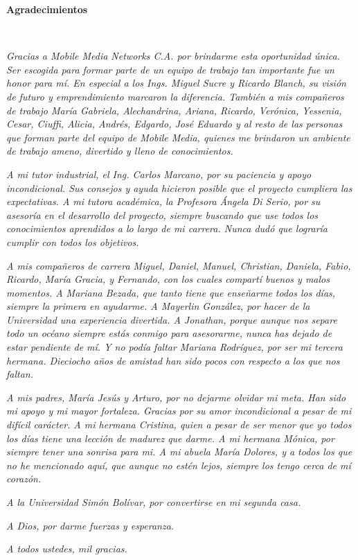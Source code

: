 \vspace*{3cm}


\textbf{\LARGE Agradecimientos}{\LARGE \par}

~

\textsl{Gracias a Mobile Media Networks C.A. por brindarme esta oportunidad
única. Ser escogida para formar parte de un equipo de trabajo tan
importante fue un honor para mí. En especial a los Ings. Miguel Sucre
y Ricardo Blanch, su visión de futuro y emprendimiento marcaron la
diferencia. También a mis compañeros de trabajo María Gabriela, Alechandrina,
Ariana, Ricardo, Verónica, Yessenia, Cesar, Ciuffi, Alicia, Andrés,
Edgardo, José Eduardo y al resto de las personas que forman parte
del equipo de Mobile Media, quienes me brindaron un ambiente de trabajo
ameno, divertido y lleno de conocimientos. }

\textsl{A mi tutor industrial, el Ing. Carlos Marcano, por su paciencia
y apoyo incondicional. Sus consejos y ayuda hicieron posible que el
proyecto cumpliera las expectativas. A mi tutora académica, la Profesora
Ángela Di Serio, por su asesoría en el desarrollo del proyecto, siempre
buscando que use todos los conocimientos aprendidos a lo largo de
mi carrera. Nunca dudó que lograría cumplir con todos los objetivos. }

\textsl{A mis compañeros de carrera Miguel, Daniel, Manuel, Christian,
Daniela, Fabio, Ricardo, María Gracia, y Fernando, con los cuales
compartí buenos y malos momentos. A Mariana Bezada, que tanto tiene
que enseñarme todos los días, siempre la primera en ayudarme. A Mayerlin
González, por hacer de la Universidad una experiencia divertida. A
Jonathan, porque aunque nos separe todo un océano siempre estás conmigo
para asesorarme, nunca has dejado de estar pendiente de mí. Y no podía
faltar Mariana Rodríguez, por ser mi tercera hermana. Dieciocho años
de amistad han sido pocos con respecto a los que nos faltan. }

\textsl{A mis padres, María Jesús y Arturo, por no dejarme olvidar
mi meta. Han sido mi apoyo y mi mayor fortaleza. Gracias por su amor
incondicional a pesar de mi difícil carácter. A mi hermana Cristina,
quien a pesar de ser menor que yo todos los días tiene una lección
de madurez que darme. A mi hermana Mónica, por siempre tener una sonrisa
para mi. A mi abuela María Dolores, y a todos los que no he mencionado
aquí, que aunque no estén lejos, siempre los tengo cerca de mí corazón. }

\textsl{A la Universidad Simón Bolívar, por convertirse en mi segunda
casa. }

\textsl{A Dios, por darme fuerzas y esperanza.}

\textsl{A todos ustedes, mil gracias.}
